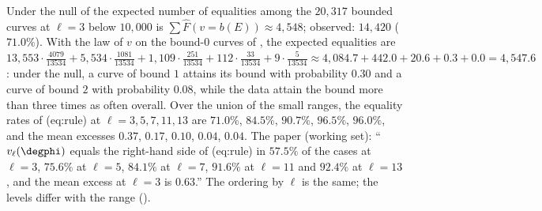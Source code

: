 \begin{sloppypar}
\begin{example}\label{ex:computation:sharpness}
Under the null of  the expected number of equalities among the $20{,}317$ bounded curves at $\ell=3$ below $10{,}000$ is
$\sum\hat F(v=b(E))\approx4{,}548$; observed: $14{,}420$ ($71.0\%$). With the law of $v$ on the bound-$0$ curves of
, the expected equalities are $13{,}553\cdot\frac{4079}{13534}+5{,}534\cdot\frac{1081}{13534}+1{,}109\cdot\frac{251}{13534}+112\cdot\frac{33}{13534}
+9\cdot\frac{5}{13534}\approx4{,}084.7+442.0+20.6+0.3+0.0=4{,}547.6$: under the null, a curve of bound $1$ attains its bound with probability $0.30$ and
a curve of bound $2$ with probability $0.08$, while the data attain the bound more than three times as often overall. Over the union of the small ranges, the equality rates of (eq:rule) at $\ell=3,5,7,11,13$ are
$71.0\%$, $84.5\%$, $90.7\%$, $96.5\%$, $96.0\%$, and the mean excesses $0.37$, $0.17$, $0.10$, $0.04$, $0.04$. The paper (working set): ``$v_\ell(\degphi)$ equals the
right-hand side of (eq:rule) in $57.5\%$ of the cases at $\ell=3$, $75.6\%$ at $\ell=5$, $84.1\%$ at $\ell=7$, $91.6\%$ at $\ell=11$ and $92.4\%$ at $\ell=13$, and the
mean excess at $\ell=3$ is $0.63$.'' The ordering by $\ell$ is the same; the levels differ with the range ().
\end{example}


\end{sloppypar}
